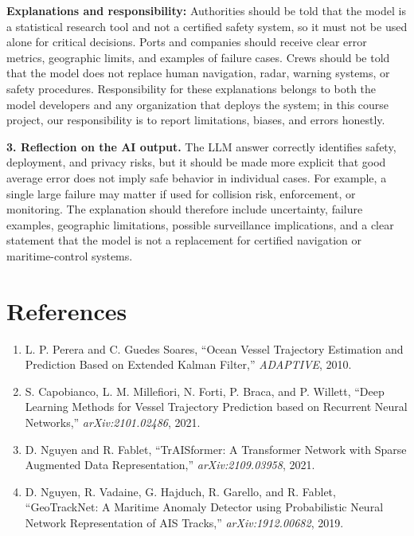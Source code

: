 \textbf{Explanations and responsibility:} Authorities should be told that the model is a statistical research tool and not a certified safety system, so it must not be used alone for critical decisions. Ports and companies should receive clear error metrics, geographic limits, and examples of failure cases. Crews should be told that the model does not replace human navigation, radar, warning systems, or safety procedures. Responsibility for these explanations belongs to both the model developers and any organization that deploys the system; in this course project, our responsibility is to report limitations, biases, and errors honestly.

\textbf{3. Reflection on the AI output.} The LLM answer correctly identifies safety, deployment, and privacy risks, but it should be made more explicit that good average error does not imply safe behavior in individual cases. For example, a single large failure may matter if used for collision risk, enforcement, or monitoring. The explanation should therefore include uncertainty, failure examples, geographic limitations, possible surveillance implications, and a clear statement that the model is not a replacement for certified navigation or maritime-control systems.

\section*{References}
{\footnotesize
\begin{enumerate}[leftmargin=1.5em,itemsep=0pt,parsep=0pt]
\item L. P. Perera and C. Guedes Soares, ``Ocean Vessel Trajectory Estimation and Prediction Based on Extended Kalman Filter,'' \emph{ADAPTIVE}, 2010.
\item S. Capobianco, L. M. Millefiori, N. Forti, P. Braca, and P. Willett, ``Deep Learning Methods for Vessel Trajectory Prediction based on Recurrent Neural Networks,'' \emph{arXiv:2101.02486}, 2021.
\item D. Nguyen and R. Fablet, ``TrAISformer: A Transformer Network with Sparse Augmented Data Representation,'' \emph{arXiv:2109.03958}, 2021.
\item D. Nguyen, R. Vadaine, G. Hajduch, R. Garello, and R. Fablet, ``GeoTrackNet: A Maritime Anomaly Detector using Probabilistic Neural Network Representation of AIS Tracks,'' \emph{arXiv:1912.00682}, 2019.
\end{enumerate}
}
